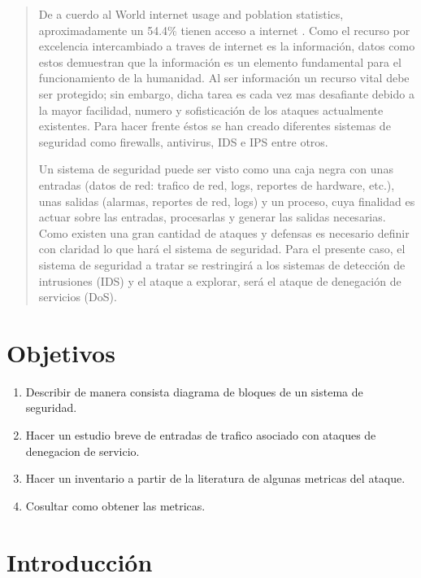 \documentclass[12pt]{article}
\begin{document}
\tableofcontents
\newpage

\begin{abstract}

De a cuerdo al World internet usage and poblation statistics, aproximadamente un 54.4\% tienen acceso a internet \citep{internet_stats}. Como el recurso por excelencia intercambiado a traves de internet es la información, datos como estos demuestran que la información es un elemento fundamental para el funcionamiento de la humanidad. Al ser información un recurso vital debe ser protegido; sin embargo, dicha tarea es cada vez mas desafiante debido a la mayor facilidad, numero y sofisticación de los ataques actualmente existentes. Para hacer frente éstos se han creado diferentes sistemas de seguridad como firewalls, antivirus, IDS e IPS entre otros.

Un sistema de seguridad puede ser visto como una caja negra con unas entradas (datos de red: trafico de red, logs, reportes de hardware, etc.), unas salidas (alarmas, reportes de red, logs) y un proceso, cuya finalidad es actuar sobre las entradas, procesarlas y generar las salidas necesarias. Como existen una gran cantidad de ataques y defensas es necesario definir con claridad lo que hará el sistema de seguridad. Para el presente caso, el sistema de seguridad a tratar se restringirá a los sistemas de detección de intrusiones (IDS) y el ataque a explorar, será el ataque de denegación de servicios (DoS).
 
\end{abstract}

\section{Objetivos}

\begin{enumerate}
\item Describir de manera consista diagrama de bloques de un sistema de seguridad.
\item Hacer un estudio breve de entradas de trafico asociado con ataques de denegacion de servicio.
\item Hacer un inventario a partir de la literatura de algunas metricas del ataque.
\item Cosultar como obtener las metricas.
\end{enumerate}

\section{Introducción}
\end{document}
